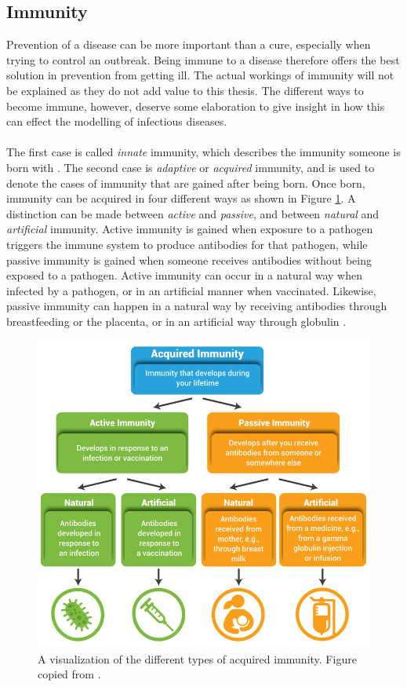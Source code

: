 \subsection{Immunity}
\label{subsec:immunity}
Prevention of a disease can be more important than a cure, especially when trying to control an outbreak. Being immune to a disease therefore offers the best solution in prevention from getting ill. The actual workings of immunity will not be explained as they do not add value to this thesis. The different ways to become immune, however, deserve some elaboration to give insight in how this can effect the modelling of infectious diseases.
\\\\
The first case is called \textit{innate} immunity, which describes the immunity someone is born with \cite{innate_immunity}. The second case is \textit{adaptive} or \textit{acquired} immunity, and is used to denote the cases of immunity that are gained after being born. Once born, immunity can be acquired in four different ways as shown in Figure \ref{fig:immunity}. A distinction can be made between \textit{active} and \textit{passive}, and between \textit{natural} and \textit{artificial} immunity. Active immunity is gained when exposure to a pathogen triggers the immune system to produce antibodies for that pathogen, while passive immunity is gained when someone receives antibodies without being exposed to a pathogen. Active immunity can occur in a natural way when infected by a pathogen, or in an artificial manner when vaccinated. Likewise, passive immunity can happen in a natural way by receiving antibodies through breastfeeding or the placenta, or in an artificial way through globulin \cite{types_of_immunity}.

\begin{figure}[ht]
    \centering
    \includegraphics[width=.6\textwidth]{2 - Modelling of infectious diseases/fig/immunity.jpg}
    \caption{A visualization of the different types of acquired immunity. Figure copied from \cite{acquired_immunity}.}
    \label{fig:immunity}
\end{figure}

